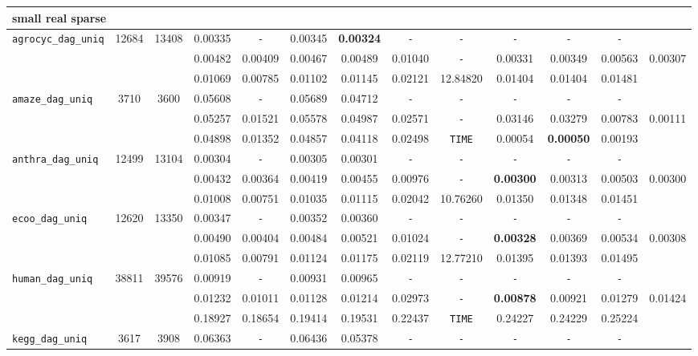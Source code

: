 \begin{table}
{\begin{tabular}{ l c c | c c c c c c c c c || c }
\multicolumn{13}{l}{\textbf{small real sparse}} \\
\hline
\verb|agrocyc_dag_uniq| & 12684 & 13408 & 0.00335 & \verb|-| & 0.00345 & \textbf{0.00324} & \verb|-| & \verb|-| & \verb|-| & \verb|-| & \verb|-| & \\
 &  &  & 0.00482 & 0.00409 & 0.00467 & 0.00489 & 0.01040 & \verb|-| & 0.00331 & 0.00349 & 0.00563 & 0.00307 \\
 &  &  & 0.01069 & 0.00785 & 0.01102 & 0.01145 & 0.02121 & 12.84820 & 0.01404 & 0.01404 & 0.01481 & \\
\hline
\verb|amaze_dag_uniq| & 3710 & 3600 & 0.05608 & \verb|-| & 0.05689 & 0.04712 & \verb|-| & \verb|-| & \verb|-| & \verb|-| & \verb|-| & \\
 &  &  & 0.05257 & 0.01521 & 0.05578 & 0.04987 & 0.02571 & \verb|-| & 0.03146 & 0.03279 & 0.00783 & 0.00111 \\
 &  &  & 0.04898 & 0.01352 & 0.04857 & 0.04118 & 0.02498 & \verb|TIME| & 0.00054 & \textbf{0.00050} & 0.00193 & \\
\hline
\verb|anthra_dag_uniq| & 12499 & 13104 & 0.00304 & \verb|-| & 0.00305 & 0.00301 & \verb|-| & \verb|-| & \verb|-| & \verb|-| & \verb|-| & \\
 &  &  & 0.00432 & 0.00364 & 0.00419 & 0.00455 & 0.00976 & \verb|-| & \textbf{0.00300} & 0.00313 & 0.00503 & 0.00300 \\
 &  &  & 0.01008 & 0.00751 & 0.01035 & 0.01115 & 0.02042 & 10.76260 & 0.01350 & 0.01348 & 0.01451 & \\
\hline
\verb|ecoo_dag_uniq| & 12620 & 13350 & 0.00347 & \verb|-| & 0.00352 & 0.00360 & \verb|-| & \verb|-| & \verb|-| & \verb|-| & \verb|-| & \\
 &  &  & 0.00490 & 0.00404 & 0.00484 & 0.00521 & 0.01024 & \verb|-| & \textbf{0.00328} & 0.00369 & 0.00534 & 0.00308 \\
 &  &  & 0.01085 & 0.00791 & 0.01124 & 0.01175 & 0.02119 & 12.77210 & 0.01395 & 0.01393 & 0.01495 & \\
\hline
\verb|human_dag_uniq| & 38811 & 39576 & 0.00919 & \verb|-| & 0.00931 & 0.00965 & \verb|-| & \verb|-| & \verb|-| & \verb|-| & \verb|-| & \\
 &  &  & 0.01232 & 0.01011 & 0.01128 & 0.01214 & 0.02973 & \verb|-| & \textbf{0.00878} & 0.00921 & 0.01279 & 0.01424 \\
 &  &  & 0.18927 & 0.18654 & 0.19414 & 0.19531 & 0.22437 & \verb|TIME| & 0.24227 & 0.24229 & 0.25224 & \\
\hline
\verb|kegg_dag_uniq| & 3617 & 3908 & 0.06363 & \verb|-| & 0.06436 & 0.05378 & \verb|-| & \verb|-| & \verb|-| & \verb|-| & \verb|-| & \\

\end{tabular}}
\end{table}
